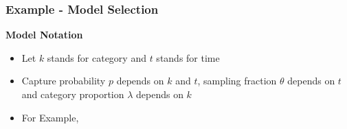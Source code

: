 \documentclass{beamer}
\begin{document}
\begin{frame} \frametitle{Example - Model Selection }
\vspace{3pt}

\textbf{{\scriptsize  Model Notation} }
{\tiny 
\begin{itemize}
\item Let $k$ stands for category and $t$ stands for time
\vspace{3pt}
\item Capture probability $p$ depends on $k$ and $t$,  sampling fraction $\theta$ depends on $t$ and category proportion $\lambda$ depends on $k$
\vspace{3pt}
\item For Example, 
\vspace{3pt}
\end{itemize}
}


\end{frame}
\end{document}

